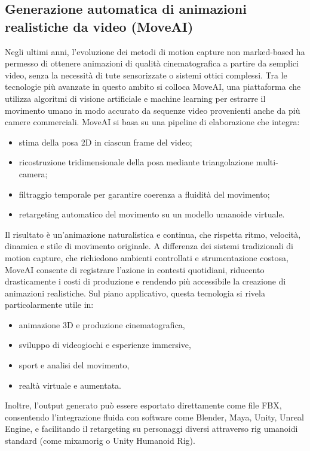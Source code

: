 \subsection{Generazione automatica di animazioni realistiche da video (MoveAI)}
Negli ultimi anni, l'evoluzione dei metodi di motion capture non marked-based ha permesso di ottenere animazioni di qualità cinematografica a partire da semplici video, senza la necessità di tute sensorizzate o sistemi ottici complessi. Tra le tecnologie più avanzate in questo ambito si colloca MoveAI, una piattaforma che utilizza algoritmi di visione artificiale e machine learning per estrarre il movimento umano in modo accurato da sequenze video provenienti anche da più camere commerciali.
MoveAI si basa su una pipeline di elaborazione che integra:
\begin{itemize}
    \item stima della posa 2D in ciascun frame del video;
    \item ricostruzione tridimensionale della posa mediante triangolazione multi-camera;
    \item filtraggio temporale per garantire coerenza a fluidità del movimento;
    \item retargeting automatico del movimento su un modello umanoide virtuale.
\end{itemize}
Il risultato è un'animazione naturalistica e continua, che rispetta ritmo, velocità, dinamica e stile di movimento originale. A differenza dei sistemi tradizionali di motion capture, che richiedono ambienti controllati e strumentazione costosa, MoveAI consente di registrare l'azione in contesti quotidiani, riducento drasticamente i costi di produzione e rendendo più accessibile la creazione di animazioni realistiche.
Sul piano applicativo, questa tecnologia si rivela particolarmente utile in:
\begin{itemize}
    \item animazione 3D e produzione cinematografica,
    \item sviluppo di videogiochi e esperienze immersive,
    \item sport e analisi del movimento,
    \item realtà virtuale e aumentata.
\end{itemize}
Inoltre, l'output generato può essere esportato direttamente come file FBX, consentendo l'integrazione fluida con software come Blender, Maya, Unity, Unreal Engine, e facilitando il retargeting su personaggi diversi attraverso rig umanoidi standard (come mixamorig o Unity Humanoid Rig).

